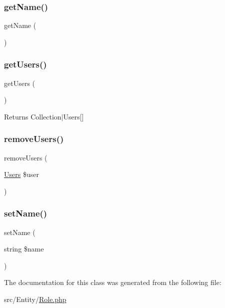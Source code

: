 \subsubsection{\texorpdfstring{get\+Name()}{getName()}}
{\footnotesize\ttfamily get\+Name (\begin{DoxyParamCaption}{ }\end{DoxyParamCaption})}

\mbox{\label{class_app_1_1_entity_1_1_role_a0fc10b64683021b70c7eb95fb514c119}} 
\subsubsection{\texorpdfstring{get\+Users()}{getUsers()}}
{\footnotesize\ttfamily get\+Users (\begin{DoxyParamCaption}{ }\end{DoxyParamCaption})}

\begin{DoxyReturn}{Returns}
Collection$\vert$\+Users\mbox{[}\mbox{]} 
\end{DoxyReturn}
\mbox{\label{class_app_1_1_entity_1_1_role_a1432bc398227897369e3cc1874a2ec17}} 
\subsubsection{\texorpdfstring{remove\+Users()}{removeUsers()}}
{\footnotesize\ttfamily remove\+Users (\begin{DoxyParamCaption}\item[{\mbox{\hyperlink{class_app_1_1_entity_1_1_users}{Users}}}]{\$user }\end{DoxyParamCaption})}

\mbox{\label{class_app_1_1_entity_1_1_role_a392752b62c4f6aacea5c269690921ef3}} 
\subsubsection{\texorpdfstring{set\+Name()}{setName()}}
{\footnotesize\ttfamily set\+Name (\begin{DoxyParamCaption}\item[{string}]{\$name }\end{DoxyParamCaption})}



The documentation for this class was generated from the following file\+:\begin{DoxyCompactItemize}
\item 
src/\+Entity/\mbox{\hyperlink{_role_8php}{Role.\+php}}\end{DoxyCompactItemize}
